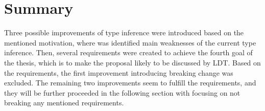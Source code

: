 \section{Summary}

Three possible improvements of type inference were introduced based on the mentioned motivation, where was identified main weaknesses of the current type inference. 
Then, several requirements were created to achieve the fourth goal of the thesis, which is to make the proposal likely to be discussed by LDT. 
Based on the requirements, the first improvement introducing breaking change was excluded. 
The remaining two improvements seem to fulfill the requirements, and they will be further proceeded in the following section with focusing on not breaking any mentioned requirements.